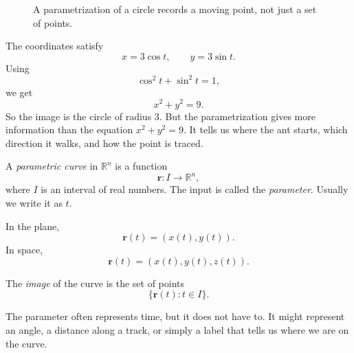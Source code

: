 \begin{figure}[h]
\centering
{}
\caption{A parametrization of a circle records a moving point, not just a set of points.}
\end{figure}

The coordinates satisfy
\[
    x=3\cos t,\qquad y=3\sin t.
\]
Using
\[
    \cos^2t+\sin^2t=1,
\]
we get
\[
    x^2+y^2=9.
\]
So the image is the circle of radius \(3\).  But the parametrization gives more
information than the equation \(x^2+y^2=9\).  It tells us where the ant starts, which
direction it walks, and how the point is traced.

\begin{definition}
A \emph{parametric curve} in \(\mathbb R^n\) is a function
\[
    \mathbf r:I\to\mathbb R^n,
\]
where \(I\) is an interval of real numbers.  The input is called the
\emph{parameter}.  Usually we write it as \(t\).

In the plane,
\[
    \mathbf r(t)=(x(t),y(t)).
\]
In space,
\[
    \mathbf r(t)=(x(t),y(t),z(t)).
\]

The \emph{image} of the curve is the set of points
\[
    \{\mathbf r(t):t\in I\}.
\]
\end{definition}

The parameter often represents time, but it does not have to.  It might represent an
angle, a distance along a track, or simply a label that tells us where we are on the
curve.


